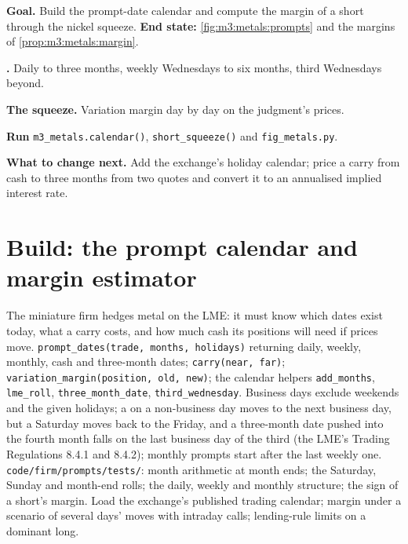 \begin{tutorial}
\textbf{Goal.} Build the prompt-date calendar and compute the margin of a short through the nickel
squeeze. \textbf{End state:} \cref{fig:m3:metals:prompts} and the margins of
\cref{prop:m3:metals:margin}.
\begin{tutsteps}
\item \textbf{.} Daily to three months, weekly Wednesdays to six months, third
Wednesdays beyond.
\label{lst:m3:metals:prompts}
\item \textbf{The squeeze.} Variation margin day by day on the judgment's prices.
\label{lst:m3:metals:squeeze}
\item \textbf{Run} \texttt{m3\_metals.calendar()}, \texttt{short\_squeeze()} and \texttt{fig\_metals.py}.
\end{tutsteps}
\textbf{What to change next.} Add the exchange's holiday calendar; price a carry from cash to three
months from two quotes and convert it to an annualised implied interest rate.
\end{tutorial}

\section{Build: the prompt calendar and margin estimator}\label{bld:m3:metals:prompts}

\begin{build}
 The miniature firm hedges metal on the LME: it must know which dates exist today,
what a carry costs, and how much cash its positions will need if prices move.
 \texttt{prompt\_dates(trade, months, holidays)} returning daily, weekly, monthly,
cash and three-month dates; \texttt{carry(near, far)}; \texttt{variation\_margin(position, old,
new)}; the calendar helpers \texttt{add\_months}, \texttt{lme\_roll}, \texttt{three\_month\_date},
\texttt{third\_wednesday}.
 Business days exclude weekends and the given holidays; a  on a non-business
day moves to the next business day, but a Saturday moves back to the Friday, and a three-month date
pushed into the fourth month falls on the last business day of the third (the LME's Trading
Regulations 8.4.1 and 8.4.2); monthly prompts start after the last weekly one.
 \texttt{code/firm/prompts/tests/}: month arithmetic at month ends; the Saturday,
Sunday and month-end rolls; the
daily, weekly and monthly structure; the sign of a short's margin.
 Load the exchange's published trading calendar; margin under a scenario of
several days' moves with intraday calls; lending-rule limits on a dominant long.
\end{build}

